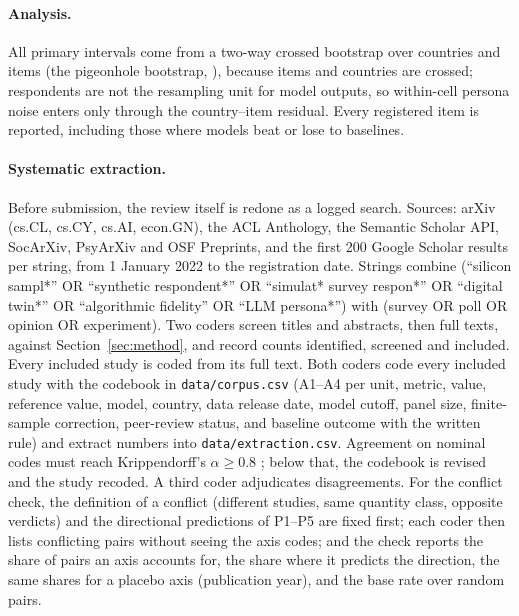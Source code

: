 \documentclass[11pt]{article}
\begin{document}
\paragraph{Analysis.} All primary intervals come from a two-way crossed bootstrap over countries and items (the pigeonhole bootstrap, \citealp{owen2007}), because items and countries are crossed; respondents are not the resampling unit for model outputs, so within-cell persona noise enters only through the country--item residual. Every registered item is reported, including those where models beat or lose to baselines.

\paragraph{Systematic extraction.}
\label{sec:extract}
Before submission, the review itself is redone as a logged search. Sources: arXiv (cs.CL, cs.CY, cs.AI, econ.GN), the ACL Anthology, the Semantic Scholar API, SocArXiv, PsyArXiv and OSF Preprints, and the first 200 Google Scholar results per string, from 1 January 2022 to the registration date. Strings combine (``silicon sampl*'' OR ``synthetic respondent*'' OR ``simulat* survey respon*'' OR ``digital twin*'' OR ``algorithmic fidelity'' OR ``LLM persona*'') with (survey OR poll OR opinion OR experiment). Two coders screen titles and abstracts, then full texts, against Section~\ref{sec:method}, and record counts identified, screened and included. Every included study is coded from its full text. Both coders code every included study with the codebook in \nolinkurl{data/corpus.csv} (A1--A4 per unit, metric, value, reference value, model, country, data release date, model cutoff, panel size, finite-sample correction, peer-review status, and baseline outcome with the written rule) and extract numbers into \nolinkurl{data/extraction.csv}. Agreement on nominal codes must reach Krippendorff's $\alpha \geq 0.8$ \citep{hayes2007}; below that, the codebook is revised and the study recoded. A third coder adjudicates disagreements. For the conflict check, the definition of a conflict (different studies, same quantity class, opposite verdicts) and the directional predictions of P1--P5 are fixed first; each coder then lists conflicting pairs without seeing the axis codes; and the check reports the share of pairs an axis accounts for, the share where it predicts the direction, the same shares for a placebo axis (publication year), and the base rate over random pairs.
\end{document}
